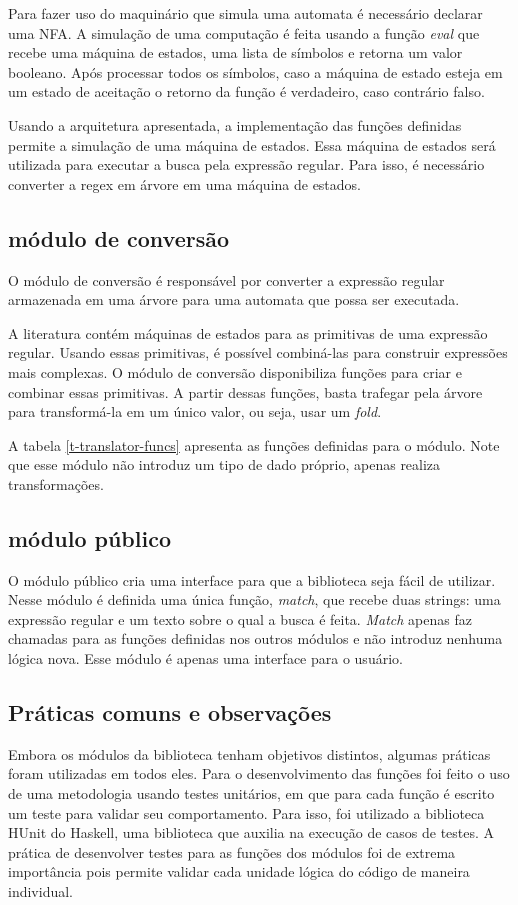 Para fazer uso do maquinário que simula uma automata é necessário declarar uma NFA.
A simulação de uma computação é feita usando a função \emph{eval} que recebe uma máquina de estados,  uma lista de símbolos e retorna um valor booleano.
Após processar todos os símbolos, caso a máquina de estado esteja em um estado de aceitação o retorno da função é verdadeiro, caso contrário falso.

Usando a arquitetura apresentada, a implementação das funções definidas permite a simulação de uma máquina de estados.
Essa máquina de estados será utilizada para executar a busca pela expressão regular.
Para isso, é necessário converter a regex em árvore em uma máquina de estados.

\subsection{módulo de conversão}

O módulo de conversão é responsável por converter a expressão regular armazenada em uma árvore para uma automata que possa ser executada.

A literatura contém máquinas de estados para as primitivas de uma expressão regular.
Usando essas primitivas, é possível combiná-las para construir expressões mais complexas.
O módulo de conversão disponibiliza funções para criar e combinar essas primitivas.
A partir dessas funções, basta trafegar pela árvore para transformá-la em um único valor, ou seja, usar um \emph{fold}.



A tabela \ref{t-translator-funcs} apresenta as funções definidas para o módulo.
Note que esse módulo não introduz um tipo de dado próprio, apenas realiza transformações.

\subsection{módulo público}
O módulo público cria uma interface para que a biblioteca seja fácil de utilizar.
Nesse módulo é definida uma única função, \emph{match}, que recebe duas strings: uma expressão regular e um texto sobre o qual a busca é feita.
\emph{Match} apenas faz chamadas para as funções definidas nos outros módulos e não introduz nenhuma lógica nova.
Esse módulo é apenas uma interface para o usuário.

\subsection{Práticas comuns e observações}
Embora os módulos da biblioteca tenham objetivos distintos, algumas práticas foram utilizadas em todos eles.
Para o desenvolvimento das funções foi feito o uso de uma metodologia usando testes unitários, em que para cada função é escrito um teste para validar seu comportamento.
Para isso, foi utilizado a biblioteca HUnit do Haskell, uma biblioteca que auxilia na execução de casos de testes.
A prática de desenvolver testes para as funções dos módulos foi de extrema importância pois permite validar cada unidade lógica do código de maneira individual.

